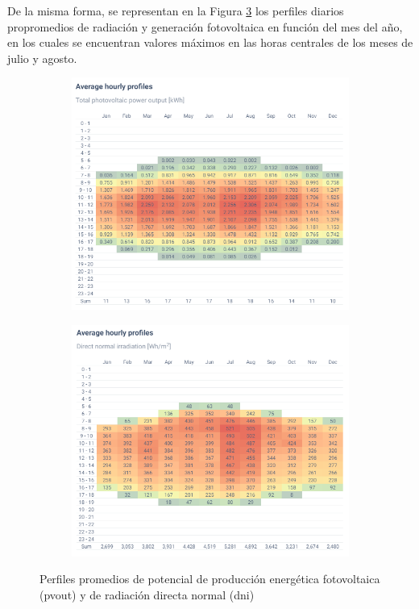De la misma forma, se representan en la Figura \ref{fig:averagehour} los perfiles diarios propromedios de radiación y generación fotovoltaica en función del mes del año, en los cuales se encuentran valores máximos en las horas centrales de los meses de julio y agosto. 

\pagebreak

\begin{figure}[H]
    \centering    
    \begin{subfigure}{0.75\linewidth}
        \centering
        \includegraphics[width=\linewidth]{img/diseno/averagepvouthour.png}
        \label{fig:averagepvouthour}
    \end{subfigure}\hfill

    \begin{subfigure}{0.75\linewidth}
        \centering
        \includegraphics[width=\linewidth]{img/diseno/averagednihour.png}
        \label{fig:averagepdnihour}
    \end{subfigure}    
    \caption{Perfiles promedios de potencial de producción energética fotovoltaica (\acrshort{pvout}) y de radiación directa normal (\acrshort{dni}) \cite{globalsolar}}
    \label{fig:averagehour}
\end{figure}

